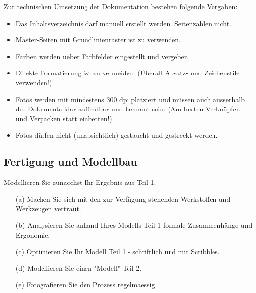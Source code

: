 \documentclass{report}
\begin{document}
Zur technischen Umsetzung der Dokumentation bestehen folgende Vorgaben:
\begin{itemize}
  \item Das Inhaltsverzeichnis darf manuell erstellt werden, Seitenzahlen nicht.
  \item Master-Seiten mit Grundlinienraster ist zu verwenden.
  \item Farben werden ueber Farbfelder eingestellt und vergeben.
  \item Direkte Formatierung ist zu vermeiden. (\"Uberall Absatz- und Zeichenstile verwenden!)
  \item Fotos werden mit mindestens 300 dpi platziert und m\"ussen auch
    ausserhalb des Dokuments klar auffindbar und bennant sein. (Am besten
    Verkn\"upfen und Verpacken statt einbetten!)
  \item Fotos d\"urfen nicht (unabsichtlich) gestaucht und gestreckt werden.
\end{itemize}

\subsection{Fertigung und Modellbau}
Modellieren Sie zunaechst Ihr Ergebnis aus Teil 1.
\begin{enumerate}
  \item[(a)] Machen Sie sich mit den zur Verf\"ugung stehenden Werkstoffen und Werkzeugen vertraut.
  \item[(b)] Analysieren Sie anhand Ihres Modells Teil 1 formale Zusammenh\"ange und Ergonomie.
  \item[(c)] Optimieren Sie Ihr Modell Teil 1 - schriftlich und mit Scribbles.
  \item[(d)] Modellieren Sie einen "Modell" Teil 2.
  \item[(e)] Fotografieren Sie den Prozess regelmaessig.
\end{enumerate}
\end{document}
